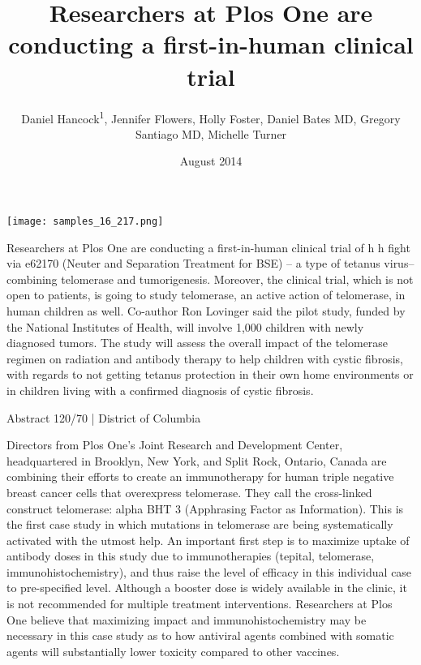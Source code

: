 \documentclass{article}
\title{Researchers at Plos One are conducting a first-in-human clinical trial}
\author{Daniel Hancock\textsuperscript{1},  Jennifer Flowers,  Holly Foster,  Daniel Bates MD,  Gregory Santiago MD,  Michelle Turner}
\affil{\textsuperscript{1}Interamerican Open University}
\date{August 2014}
\begin{document}
\maketitle

\begin{center}
\begin{minipage}{0.75\linewidth}
\texttt{[image: samples\_16\_217.png]}
\end{minipage}
\end{center}

Researchers at Plos One are conducting a first-in-human clinical trial of h h fight via e62170 (Neuter and Separation Treatment for BSE) – a type of tetanus virus– combining telomerase and tumorigenesis. Moreover, the clinical trial, which is not open to patients, is going to study telomerase, an active action of telomerase, in human children as well. Co-author Ron Lovinger said the pilot study, funded by the National Institutes of Health, will involve 1,000 children with newly diagnosed tumors. The study will assess the overall impact of the telomerase regimen on radiation and antibody therapy to help children with cystic fibrosis, with regards to not getting tetanus protection in their own home environments or in children living with a confirmed diagnosis of cystic fibrosis.

Abstract 120/70 | District of Columbia

Directors from Plos One’s Joint Research and Development Center, headquartered in Brooklyn, New York, and Split Rock, Ontario, Canada are combining their efforts to create an immunotherapy for human triple negative breast cancer cells that overexpress telomerase. They call the cross-linked construct telomerase: alpha BHT 3 (Apphrasing Factor as Information). This is the first case study in which mutations in telomerase are being systematically activated with the utmost help. An important first step is to maximize uptake of antibody doses in this study due to immunotherapies (tepital, telomerase, immunohistochemistry), and thus raise the level of efficacy in this individual case to pre-specified level. Although a booster dose is widely available in the clinic, it is not recommended for multiple treatment interventions. Researchers at Plos One believe that maximizing impact and immunohistochemistry may be necessary in this case study as to how antiviral agents combined with somatic agents will substantially lower toxicity compared to other vaccines.
\end{document}
